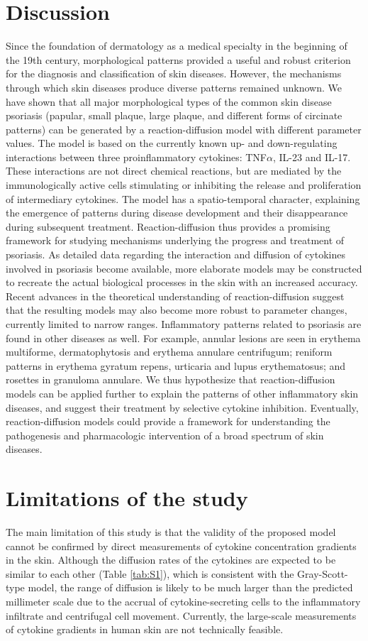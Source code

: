 \section{Discussion}
Since the foundation of dermatology as a medical specialty in the beginning of the 19th century, morphological patterns provided a useful and robust criterion for the diagnosis and classification of skin diseases. However, the mechanisms through which skin diseases produce diverse patterns remained unknown. We have shown that all major morphological types of the common skin disease psoriasis (papular, small plaque, large plaque, and different forms of circinate patterns) can be generated by a reaction-diffusion model with different parameter values. The model is based on the currently known up- and down-regulating interactions between three proinflammatory cytokines: TNF$\alpha$, IL-23 and IL-17. These interactions are not direct chemical reactions, but are mediated by the immunologically active cells stimulating or inhibiting the release and proliferation of intermediary cytokines. The model has a spatio-temporal character, explaining the emergence of patterns during disease development and their disappearance during subsequent treatment. Reaction-diffusion thus provides a promising framework for studying mechanisms underlying the progress and treatment of psoriasis. As detailed data regarding the interaction and diffusion of cytokines involved in psoriasis become available, more elaborate models may be constructed to recreate the actual biological processes in the skin with an increased accuracy. Recent advances in the theoretical understanding of reaction-diffusion \citep{diego2018} suggest that the resulting models may also become more robust to parameter changes, currently limited to narrow ranges. Inflammatory patterns related to psoriasis are found in other diseases as well. For example, annular lesions are seen in erythema multiforme, dermatophytosis and erythema annulare centrifugum; reniform patterns in erythema gyratum repens, urticaria and lupus erythematosus; and rosettes in granuloma annulare. We thus hypothesize that reaction-diffusion models can be applied further to explain the patterns of other inflammatory skin diseases, and suggest their treatment by selective cytokine inhibition. Eventually, reaction-diffusion models could provide a framework for understanding the pathogenesis and pharmacologic intervention of a broad spectrum of skin diseases. 

\section{Limitations of the study}
The main limitation of this study is that the validity of the proposed model cannot be confirmed by direct measurements of cytokine concentration gradients in the skin. Although the diffusion rates of the cytokines are expected to be similar to each other (Table \ref{tab:S1}), which is consistent with the Gray-Scott-type model, the range of diffusion is likely to be much larger than the predicted millimeter scale due to the accrual of cytokine-secreting cells to the inflammatory infiltrate and centrifugal cell movement. Currently, the large-scale measurements of cytokine gradients in human skin are not technically feasible. 

